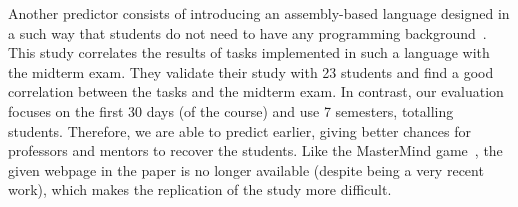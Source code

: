 Another predictor consists of introducing an assembly-based language designed in a such way that students do not need to have any programming background~\cite{harris-assembly-jcsc2014}. This study correlates the results of tasks implemented in such a language with the midterm exam. They validate their study with 23 students and find a good correlation between the tasks and the midterm exam. In contrast, our evaluation focuses on the first 30 days (\semesterPercentage of the course) and use 7 semesters, totalling \totalStudents students. Therefore, we are able to predict earlier, giving better chances for professors and mentors to recover the students. Like the MasterMind game~\cite{lorenzenC06-mastermind-predictor-sigcse2008}, the given webpage in the paper is no longer available (despite being a very recent work), which makes the replication of the study more difficult.


